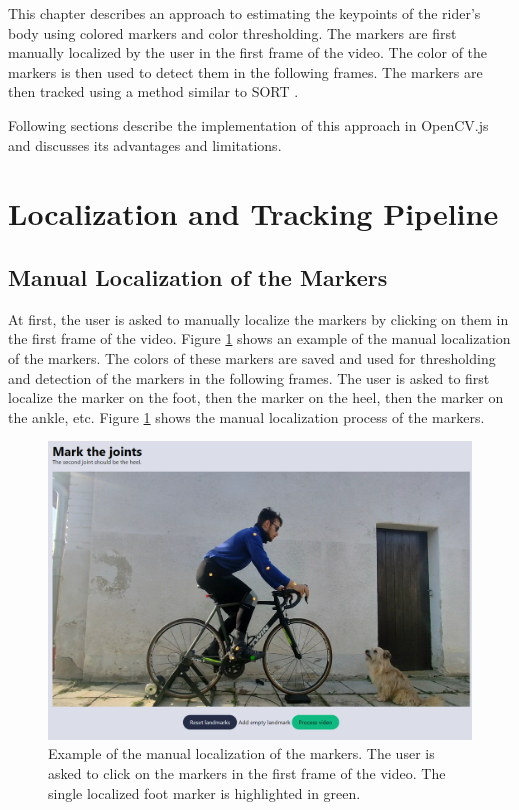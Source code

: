 This chapter describes an approach to estimating the keypoints of the rider's body using colored markers and color thresholding. The markers are first manually localized by the user in the first frame of the video. The color of the markers is then used to detect them in the following frames. The markers are then tracked using a method similar to SORT \cite{sort}.

Following sections describe the implementation of this approach in OpenCV.js \cite{opencvjs} and discusses its advantages and limitations.

\section{Localization and Tracking Pipeline}

\subsection{Manual Localization of the Markers}
\label{manual_localization_of_the_markers}
At first, the user is asked to manually localize the markers by clicking on them in the first frame of the video. Figure \ref{fig:marker_localization} shows an example of the manual localization of the markers. The colors of these markers are saved and used for thresholding and detection of the markers in the following frames. The user is asked to first localize the marker on the foot, then the marker on the heel, then the marker on the ankle, etc. Figure \ref{fig:marker_localization} shows the manual localization process of the markers.

\begin{figure}[htbp]
    \centering
    \includegraphics[width=\textwidth]{obrazky-figures/markers_localization.png}
    \caption{Example of the manual localization of the markers. The user is asked to click on the markers in the first frame of the video. The single localized foot marker is highlighted in green.}
    \label{fig:marker_localization}
\end{figure}




